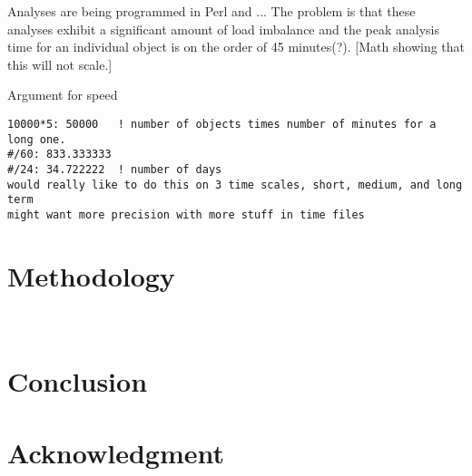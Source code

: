 \documentclass[conference]{IEEEtran}
\begin{document}
Analyses are being programmed in Perl and ...  The problem
is that these analyses exhibit a significant amount of load imbalance
and the peak analysis time for an individual object is 
on the order of 45 minutes(?).
[Math showing that this will not scale.]

Argument for speed
\begin{verbatim}
10000*5: 50000   ! number of objects times number of minutes for a long one. 
#/60: 833.333333 
#/24: 34.722222  ! number of days
would really like to do this on 3 time scales, short, medium, and long term
might want more precision with more stuff in time files
\end{verbatim}

\section{Methodology}

~\cite{ChapelOverviewJan13}


\section{Conclusion}




\section*{Acknowledgment}




\end{document}
